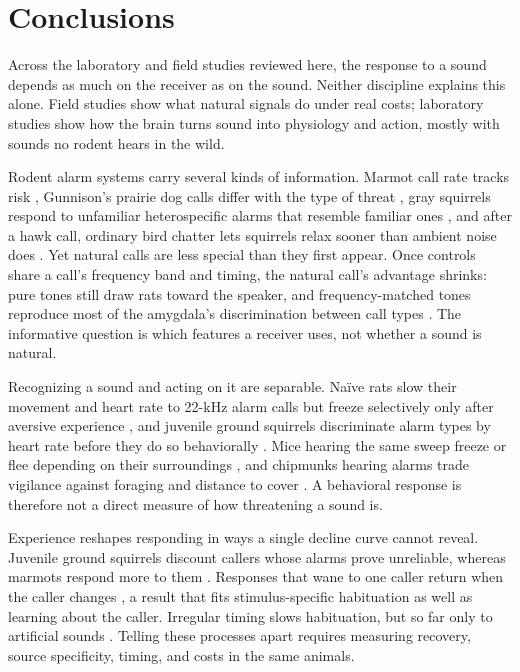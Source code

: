\section{Conclusions}
\label{sec:conclusions}

Across the laboratory and field studies reviewed here, the response to a sound depends as much on the receiver as on the sound. Neither discipline explains this alone. Field studies show what natural signals do under real costs; laboratory studies show how the brain turns sound into physiology and action, mostly with sounds no rodent hears in the wild.

Rodent alarm systems carry several kinds of information. Marmot call rate tracks risk \citep{BlumsteinArmitage1997}, Gunnison's prairie dog calls differ with the type of threat \citep{KiriazisSlobodchikoff2006}, gray squirrels respond to unfamiliar heterospecific alarms that resemble familiar ones \citep{GetschowEtAl2013}, and after a hawk call, ordinary bird chatter lets squirrels relax sooner than ambient noise does \citep{LillyEtAl2019}. Yet natural calls are less special than they first appear. Once controls share a call's frequency band and timing, the natural call's advantage shrinks: pure tones still draw rats toward the speaker, and frequency-matched tones reproduce most of the amygdala's discrimination between call types \citep{WohrSchwarting2007,ParsanaEtAl2012a}. The informative question is which features a receiver uses, not whether a sound is natural.

Recognizing a sound and acting on it are separable. Naïve rats slow their movement and heart rate to 22-kHz alarm calls but freeze selectively only after aversive experience \citep{OlszynskiEtAl2020,KimEtAl2010}, and juvenile ground squirrels discriminate alarm types by heart rate before they do so behaviorally \citep{Mateo1996}. Mice hearing the same sweep freeze or flee depending on their surroundings \citep{MongeauEtAl2003}, and chipmunks hearing alarms trade vigilance against foraging and distance to cover \citep{BaackSwitzer2000}. A behavioral response is therefore not a direct measure of how threatening a sound is.

Experience reshapes responding in ways a single decline curve cannot reveal. Juvenile ground squirrels discount callers whose alarms prove unreliable, whereas marmots respond more to them \citep{HareAtkins2001,BlumsteinEtAl2004}. Responses that wane to one caller return when the caller changes \citep{Hare1998}, a result that fits stimulus-specific habituation as well as learning about the caller. Irregular timing slows habituation, but so far only to artificial sounds \citep{Davis1970,HerryEtAl2007}. Telling these processes apart requires measuring recovery, source specificity, timing, and costs in the same animals.

